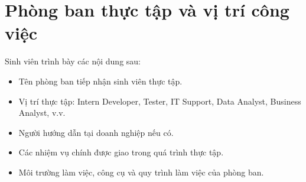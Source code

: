 \section{Phòng ban thực tập và vị trí công việc}

Sinh viên trình bày các nội dung sau:

\begin{itemize}
    \item Tên phòng ban tiếp nhận sinh viên thực tập.
    \item Vị trí thực tập: Intern Developer, Tester, IT Support, Data Analyst, Business Analyst, v.v.
    \item Người hướng dẫn tại doanh nghiệp nếu có.
    \item Các nhiệm vụ chính được giao trong quá trình thực tập.
    \item Môi trường làm việc, công cụ và quy trình làm việc của phòng ban.
\end{itemize}
